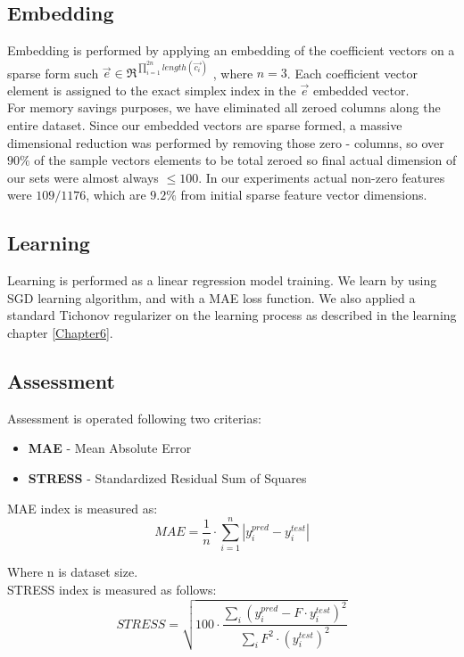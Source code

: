 \subsection{Embedding}
Embedding is performed by applying an embedding of the coefficient vectors on a sparse form such $\overrightarrow{e} \in \Re^{\prod_{i=1}^{2n}{length(\overrightarrow{c_i})}}$ , where $n = 3$.
Each coefficient vector element is assigned to the exact simplex index in the $\overrightarrow{e}$ embedded vector.
\\
For memory savings purposes, we have eliminated all zeroed columns along the entire dataset.
Since our embedded vectors are sparse formed, a massive dimensional reduction was performed by removing those zero - columns, so over $90 \% $ of the sample vectors elements to be total zeroed so final actual dimension of our sets were almost always $ \le 100$. In our experiments actual non-zero features were $109/1176$, which are $9.2 \%$ from initial sparse feature vector dimensions.

\subsection{Learning}
Learning is performed as a linear regression model training.
We learn by using SGD \cite{SGD} learning algorithm, and with a MAE \cite{MAE} loss function.
We also applied a standard Tichonov \cite{Tichonov} regularizer on the learning process as described in the learning chapter \ref{Chapter6}.
\cite{retargeting} \cite{einstein}

\subsection{Assessment}
Assessment is operated following two criterias:
\begin{itemize}
\item \textbf{MAE} - Mean Absolute Error
\item \textbf{STRESS} - Standardized Residual Sum of Squares \cite{STRESS} \\
\end{itemize}

MAE index is measured as:
\begin{equation}
MAE = \frac{1}{n} \cdot \sum_{i = 1}^{n}{|y^{pred}_i - y^{test}_i|}
\end{equation}

Where n is dataset size. \\

STRESS index is measured as follows:
\begin{equation}
STRESS = \sqrt{100 \cdot \dfrac{\sum\limits_{i}{(y^{pred}_i - F \cdot y^{test}_i)^2}}{\sum\limits_{i}^{}{F^2 \cdot (y^{test}_i)^2 }}}
\end{equation}

